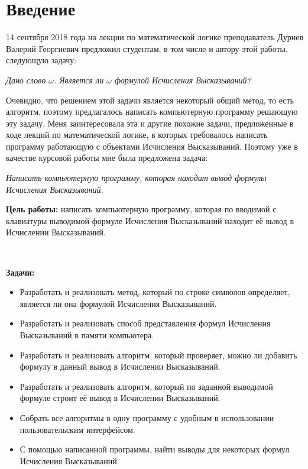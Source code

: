 \documentclass[a4paper,12pt]{article}
\theoremstyle{definition}
\begin{document}
	
	\renewcommand*\contentsname{Оглавление}
	\tableofcontents
	
	\section*{Введение}
	
	14 сентября 2018 года на лекции по математической логике преподаватель Дурнев Валерий Георгиевич предложил студентам, в том числе и автору этой работы, следующую задачу:
	 \begin{center}
		\textit{Дано слово $ \omega $. Является ли $ \omega $ формулой Исчисления Высказываний?} 
	\end{center}
	Очевидно, что решением этой задачи является некоторый общий метод, то есть алгоритм, поэтому предлагалось написать компьютерную программу решающую эту задачу. Меня заинтересовала эта и другие похожие задачи, предложенные в ходе лекций по математической логике, в которых требовалось написать программу работающую с объектами Исчисления Высказываний. Поэтому уже в качестве курсовой работы мне была предложена задача:
	\begin{center}
		\textit{Написать компьютерную программу, которая находит вывод формулы Исчисления Высказываний.}
	\end{center} 
	
	\textbf{Цель работы:} написать компьютерную программу, которая по вводимой с клавиатуры выводимой формуле Исчисления Высказываний находит её вывод в Исчислении Высказываний.
	
	~
	
	\textbf{Задачи:}
	\begin{itemize}
		\item Разработать и реализовать метод, который по строке символов определяет, является ли она формулой Исчисления Высказываний.
		\item Разработать и реализовать способ представления формул Исчисления Высказываний в памяти компьютера.
		\item Разработать и реализовать алгоритм, который проверяет, можно ли добавить формулу в данный вывод в Исчислении Высказываний.
		\item Разработать и реализовать алгоритм, который по заданной выводимой формуле строит её вывод в Исчислении Высказываний.
		\item Собрать все алгоритмы в одну программу с удобным в использовании пользовательским интерфейсом.
		\item С помощью написанной программы, найти выводы для некоторых формул  Исчисления Высказываний.	
	\end{itemize}	
\end{document}
